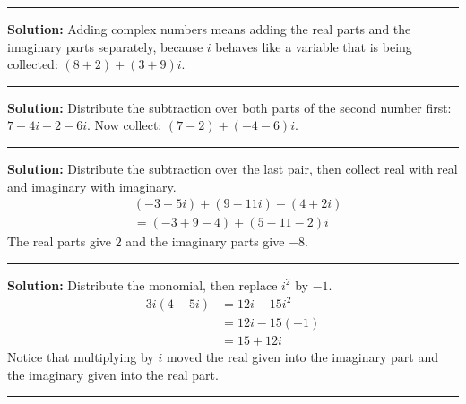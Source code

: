 \documentclass[12pt]{article}
\begin{document}



\vspace{0.3cm}
\noindent\rule{\linewidth}{0.4pt}
\vspace{0.2cm}


\textbf{Solution:} Adding complex numbers means adding the real parts and the
imaginary parts separately, because $i$ behaves like a variable that is being
collected: $(8 + 2) + (3 + 9)i$. 

\vspace{0.15cm}
\noindent\rule{\linewidth}{0.2pt}


\textbf{Solution:} Distribute the subtraction over both parts of the second
number first: $7 - 4i - 2 - 6i$. Now collect: $(7 - 2) + (-4 - 6)i$. 

\vspace{0.15cm}
\noindent\rule{\linewidth}{0.2pt}


\textbf{Solution:} Distribute the subtraction over the last pair, then collect
real with real and imaginary with imaginary.
\begin{align*}
  &(-3 + 5i) + (9 - 11i) - (4 + 2i) \\
  &= (-3 + 9 - 4) + (5 - 11 - 2)i
\end{align*}
The real parts give $2$ and the imaginary parts give $-8$. 

\vspace{0.15cm}
\noindent\rule{\linewidth}{0.2pt}


\textbf{Solution:} Distribute the monomial, then replace $i^2$ by $-1$.
\begin{align*}
  3i(4 - 5i) &= 12i - 15i^2 \\
             &= 12i - 15(-1) \\
             &= 15 + 12i
\end{align*}
Notice that multiplying by $i$ moved the real given into the imaginary part and
the imaginary given into the real part. 

\vspace{0.15cm}
\noindent\rule{\linewidth}{0.2pt}
\end{document}
